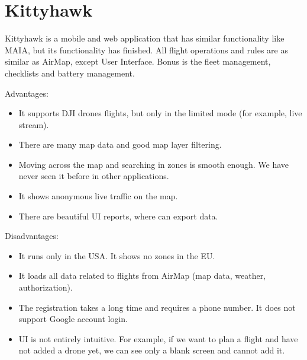 \section{Kittyhawk}\label{sec:kittyhawk}
Kittyhawk is a mobile and web application that has similar functionality like MAIA, but its functionality has finished.
All flight operations and rules are as similar as AirMap, except User Interface.
Bonus is the fleet management, checklists and battery management.

Advantages:
\begin{itemize}
    \item It supports DJI drones flights, but only in the limited mode (for example, live stream).
    \item There are many map data and good map layer filtering.
    \item Moving across the map and searching in zones is smooth enough.
    We have never seen it before in other applications.
    \item It shows anonymous live traffic on the map.
    \item There are beautiful UI reports, where can export data.
\end{itemize}
Disadvantages:
\begin{itemize}
    \item It runs only in the USA. It shows no zones in the EU.
    \item It loads all data related to flights from AirMap (map data, weather, authorization).
    \item The registration takes a long time and requires a phone number.
    It does not support Google account login.
    \item UI is not entirely intuitive.
    For example, if we want to plan a flight and have not added a drone yet, we can see only a blank screen and cannot add it.
\end{itemize}
